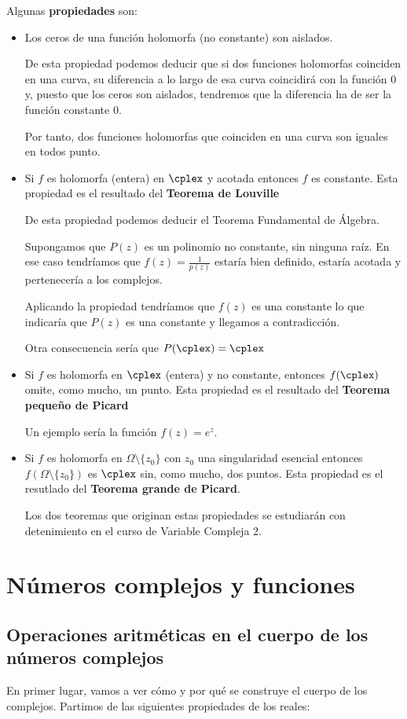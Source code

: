 \documentclass{apuntes}
\begin{document}
Algunas \textbf{propiedades} son:
\begin{itemize}
\item Los ceros de una función holomorfa (no constante) son aislados.

De esta propiedad podemos deducir que si dos funciones holomorfas coinciden en una curva, su diferencia a lo largo de esa curva coincidirá con la función 0 y, puesto que los ceros son aislados, tendremos que la diferencia ha de ser la función constante 0.

Por tanto, dos funciones holomorfas que coinciden en una curva son iguales en todos punto.

\item Si $f$ es holomorfa (entera) en $\cplex$ y acotada entonces $f$ es constante. Esta propiedad es el resultado del \textbf{Teorema de Louville}

De esta propiedad podemos deducir el Teorema Fundamental de Álgebra.

Supongamos que $P(z)$ es un polinomio no constante, sin ninguna raíz. En ese caso tendríamos que $f(z)=\frac{1}{p(z)}$ estaría bien definido, estaría acotada y pertenecería a los complejos.

Aplicando la propiedad tendríamos que $f(z)$ es una constante lo que indicaría que $P(z)$ es una constante y llegamos a contradicción.

Otra consecuencia sería que $P(\cplex)=\cplex$

\item Si $f$ es holomorfa en $\cplex$  (entera) y no constante, entonces $f(\cplex)$ omite, como mucho, un punto. Esta propiedad es el resultado del \textbf{Teorema pequeño de Picard}

Un ejemplo sería la función $f(z)=e^z$.

\item Si $f$ es holomorfa en $\Omega\setminus \{z_0\}$ con $z_0$ una singularidad esencial entonces $f(\Omega\setminus \{z_0\})$ es $\cplex$ sin, como mucho, dos puntos. Esta propiedad es el resutlado del \textbf{Teorema grande de Picard}.

Los dos teoremas que originan estas propiedades se estudiarán con detenimiento en el curso de Variable Compleja 2.
\end{itemize}

\chapter{Números complejos y funciones}
\section{Operaciones aritméticas en el cuerpo de los números complejos}
En primer lugar, vamos a ver cómo y por qué se construye el cuerpo de los complejos.
Partimos de las siguientes propiedades de los reales:
\end{document}
